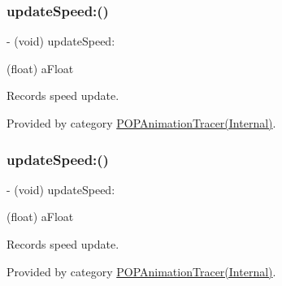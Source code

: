 \mbox{\label{interface_p_o_p_animation_tracer_a7f31ab4b95f8d9409a77b78bf7b8af1d}} 
\subsubsection{\texorpdfstring{update\+Speed\+:()}{updateSpeed:()}\hspace{0.1cm}{\footnotesize\ttfamily [1/2]}}
{\footnotesize\ttfamily -\/ (void) update\+Speed\+: \begin{DoxyParamCaption}\item[{(float)}]{a\+Float }\end{DoxyParamCaption}}

Records speed update. 

Provided by category \mbox{\hyperlink{category_p_o_p_animation_tracer_07_internal_08_a7f31ab4b95f8d9409a77b78bf7b8af1d}{P\+O\+P\+Animation\+Tracer(\+Internal)}}.

\mbox{\label{interface_p_o_p_animation_tracer_a7f31ab4b95f8d9409a77b78bf7b8af1d}} 
\subsubsection{\texorpdfstring{update\+Speed\+:()}{updateSpeed:()}\hspace{0.1cm}{\footnotesize\ttfamily [2/2]}}
{\footnotesize\ttfamily -\/ (void) update\+Speed\+: \begin{DoxyParamCaption}\item[{(float)}]{a\+Float }\end{DoxyParamCaption}}

Records speed update. 

Provided by category \mbox{\hyperlink{category_p_o_p_animation_tracer_07_internal_08_a7f31ab4b95f8d9409a77b78bf7b8af1d}{P\+O\+P\+Animation\+Tracer(\+Internal)}}.

\mbox{\label{interface_p_o_p_animation_tracer_a5010bbc6fa2ec5426d33706651e584de}} 
